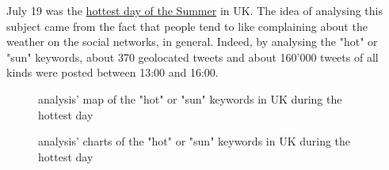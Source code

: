 \documentclass[a4paper,11pt]{report}
\begin{document}
July 19 was the \underline{hottest day of the Summer} in UK. The idea of analysing this subject came from the fact that people tend to like complaining about the weather on the social networks, in general. Indeed, by analysing the "hot" or "sun" keywords, about 370 geolocated tweets and about 160'000 tweets of all kinds were posted between 13:00 and 16:00.
\begin{figure}[H]
\vspace{-5pt}
\begin{center}
\vspace{-20pt}
\caption{analysis' map of the "hot" or "sun" keywords in UK during the hottest day}
\end{center}
\end{figure}
\vspace{-10pt}

\begin{figure}[H]
\vspace{-5pt}
\begin{center}
\vspace{-20pt}
\caption{analysis' charts of the "hot" or "sun" keywords in UK during the hottest day}
\end{center}
\end{figure}
\vspace{-10pt}
\end{document}
